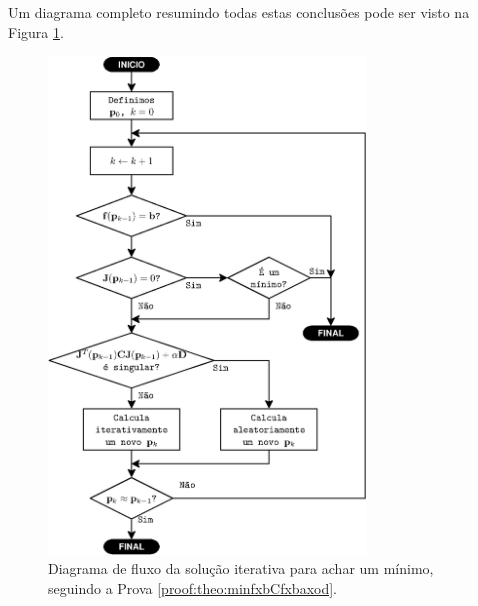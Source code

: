 \begin{myproofT}
Um diagrama completo resumindo todas estas conclusões pode ser visto na Figura \ref{fig:fluxo3}.
\end{myproofT}
\begin{figure}[!h]
     \centering
         \includegraphics[width=0.75\textwidth]{chapters/minimization-fx/fluxo3.eps}
        \caption{Diagrama de fluxo da solução iterativa para achar um mínimo, seguindo a Prova \ref{proof:theo:minfxbCfxbaxod}.}
        \label{fig:fluxo3}
\end{figure}
